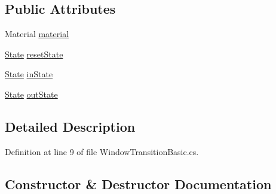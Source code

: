 \subsection*{Public Attributes}
\begin{DoxyCompactItemize}
\item 
Material \hyperlink{class_unity_engine_1_1_u_i_1_1_windows_1_1_animations_1_1_window_transition_basic_1_1_parameters_a089d55e5202e5a3b9eb792f7c5bdc238}{material}
\item 
\hyperlink{class_unity_engine_1_1_u_i_1_1_windows_1_1_animations_1_1_window_transition_basic_1_1_parameters_1_1_state}{State} \hyperlink{class_unity_engine_1_1_u_i_1_1_windows_1_1_animations_1_1_window_transition_basic_1_1_parameters_a032c15c1e1469238dd7077ad9c172fd3}{reset\+State}
\item 
\hyperlink{class_unity_engine_1_1_u_i_1_1_windows_1_1_animations_1_1_window_transition_basic_1_1_parameters_1_1_state}{State} \hyperlink{class_unity_engine_1_1_u_i_1_1_windows_1_1_animations_1_1_window_transition_basic_1_1_parameters_a99afa939d62caf24d92b664b6eff4d5d}{in\+State}
\item 
\hyperlink{class_unity_engine_1_1_u_i_1_1_windows_1_1_animations_1_1_window_transition_basic_1_1_parameters_1_1_state}{State} \hyperlink{class_unity_engine_1_1_u_i_1_1_windows_1_1_animations_1_1_window_transition_basic_1_1_parameters_a437b3a881c68c3ae997fdf4e1c906ba7}{out\+State}
\end{DoxyCompactItemize}


\subsection{Detailed Description}


Definition at line 9 of file Window\+Transition\+Basic.\+cs.



\subsection{Constructor \& Destructor Documentation}
\hypertarget{class_unity_engine_1_1_u_i_1_1_windows_1_1_animations_1_1_window_transition_basic_1_1_parameters_a35fae7c36d6907fdc58ecfb42632e0c5}{}
